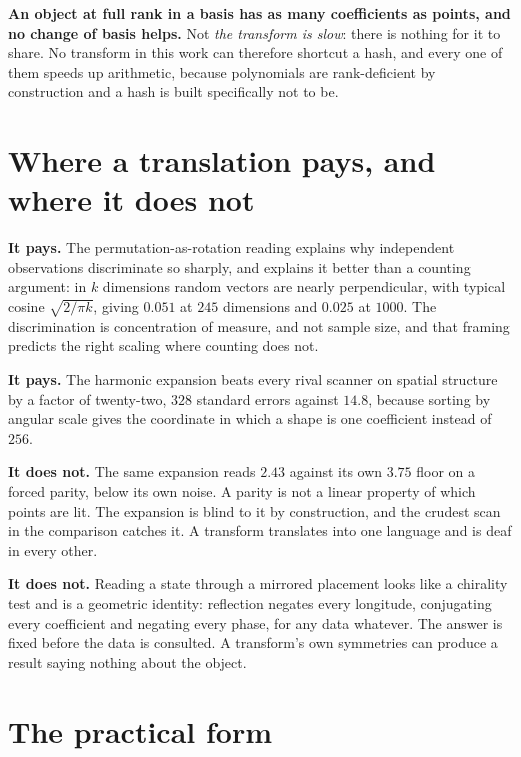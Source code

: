 \textbf{An object at full rank in a basis has as many coefficients as points, and no change of basis helps.} Not \emph{the transform is slow}: there is nothing for it to share. No transform in this work can therefore shortcut a hash, and every one of them speeds up arithmetic, because polynomials are rank-deficient by construction and a hash is built specifically not to be.

\section{Where a translation pays, and where it does not}

\textbf{It pays.} The permutation-as-rotation reading explains why independent observations discriminate so sharply, and explains it better than a counting argument: in \(k\) dimensions random vectors are nearly perpendicular, with typical cosine \(\sqrt{2/\pi k}\), giving \(0.051\) at \(245\) dimensions and \(0.025\) at \(1000\). The discrimination is concentration of measure, and not sample size, and that framing predicts the right scaling where counting does not.

\textbf{It pays.} The harmonic expansion beats every rival scanner on spatial structure by a factor of twenty-two, \(328\) standard errors against \(14.8\), because sorting by angular scale gives the coordinate in which a shape is one coefficient instead of \(256\).

\textbf{It does not.} The same expansion reads \(2.43\) against its own \(3.75\) floor on a forced parity, below its own noise. A parity is not a linear property of which points are lit. The expansion is blind to it by construction, and the crudest scan in the comparison catches it. A transform translates into one language and is deaf in every other.

\textbf{It does not.} Reading a state through a mirrored placement looks like a chirality test and is a geometric identity: reflection negates every longitude, conjugating every coefficient and negating every phase, for any data whatever. The answer is fixed before the data is consulted. A transform's own symmetries can produce a result saying nothing about the object.

\section{The practical form}

